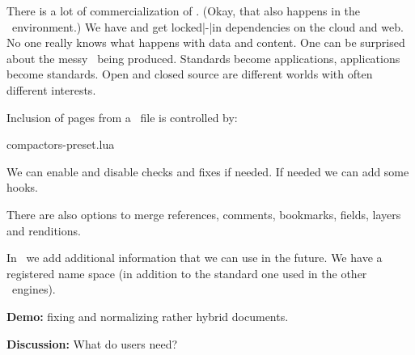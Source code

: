 \stoptitle

\starttitle[title=Closed source]

\startitemize
\startitem There is a lot of commercialization of \PDF. \stopitem
\startitem (Okay, that also happens in the \TEX\ environment.) \stopitem
\startitem We have and get locked|-|in dependencies on the cloud and web. \stopitem
\startitem No one really knows what happens with data and content. \stopitem
\startitem One can be surprised about the messy \PDF\ being produced. \stopitem
\startitem Standards become applications, applications become standards. \stopitem
\startitem Open and closed source are different worlds with often different interests. \stopitem
\stopitemize

\stoptitle

\starttitle[title=New in \CONTEXT]

Inclusion of pages from a \PDF\ file is controlled by:

\starttyping
compactors-preset.lua
\stoptyping

We can enable and disable checks and fixes if needed. If needed we can add some hooks.

There are also options to merge references, comments, bookmarks, fields, layers
and renditions.

In \LMTX\ we add additional information that we can use in the future. We have a registered
name space (in addition to the standard one used in the other \TEX\ engines).

{\bf Demo:} fixing and normalizing rather hybrid documents.

{\bf Discussion:} What do users need?

\stoptitle

\stopdocument

